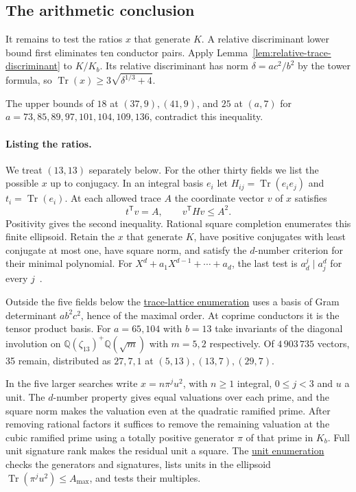 \documentclass[11pt,reqno]{amsart}
\newcommand{\codecheck}[2]{\href{https://github.com/sebastienpalcoux/grothendieck-ring-classification/blob/d5750105bb5758f3ad38d2e5464dfcc12c019816/supplements/rank6/sphericality/#1}{#2}}
\theoremstyle{remark}\newtheorem{remark}[theorem]{Remark}
\numberwithin{equation}{section}
\begin{document}
\subsection{The arithmetic conclusion}
It remains to test the ratios $x$ that generate $K$. A relative
discriminant lower bound first eliminates ten conductor pairs.
Apply Lemma~\ref{lem:relative-trace-discriminant} to $K/K_b$.
Its relative discriminant has norm $\delta=ac^2/b^2$ by the tower
formula, so $\operatorname{Tr}(x)\ge3\sqrt{\delta^{1/3}+4}$.

The upper
bounds of $18$ at $(37,9),(41,9)$, and $25$ at $(a,7)$ for
$a=73,85,89,97,101,104,109,136$, contradict this inequality.

\paragraph{Listing the ratios.}
We treat $(13,13)$ separately below. For the other thirty fields we
list the possible $x$ up to conjugacy. In an integral basis $e_i$ let
$H_{ij}=\operatorname{Tr}(e_ie_j)$ and $t_i=\operatorname{Tr}(e_i)$.
At each allowed trace $A$ the coordinate vector $v$ of $x$ satisfies
\[
 t^{\mathsf T}v=A,\qquad v^{\mathsf T}Hv\le A^2.
\]
Positivity gives the second inequality. Rational square completion
enumerates this finite ellipsoid. Retain the $x$ that generate $K$, have positive conjugates with least
conjugate at most one, have square norm, and satisfy the $d$-number
criterion for their minimal polynomial.
For $X^d+a_1X^{d-1}+\cdots+a_d$, the last test is
$a_d^j\mid a_j^d$ for every $j$~\cite{OstrikCodegrees}.

Outside the five fields below the
\codecheck{sextic_complement/sextic_lattice.py}{trace-lattice enumeration}
uses a basis of Gram determinant $ab^2c^2$, hence of the maximal order.
At coprime conductors it is the tensor product basis. For $a=65,104$
with $b=13$ take invariants of the diagonal involution on
$\mathbb Q(\zeta_{13})^+\mathbb Q(\sqrt m)$ with $m=5,2$ respectively.
Of $4\,903\,735$ vectors, 35 remain, distributed as $27,7,1$ at
$(5,13),(13,7),(29,7)$.

In the five larger searches write $x=n\pi^j u^2$, with $n\ge1$ integral,
$0\le j<3$ and $u$ a unit. The $d$-number property gives equal
valuations over each prime, and the square norm makes the valuation
even at the quadratic ramified prime. After removing rational factors
it suffices to remove the remaining valuation at the cubic ramified
prime using a totally positive generator $\pi$ of that prime in $K_b$.
Full unit signature rank makes the residual unit a square. The
\codecheck{sextic_complement/positive_dnumber_squares.py}{unit enumeration}
checks the generators and signatures, lists units in the ellipsoid
$\operatorname{Tr}(\pi^j u^2)\le A_{\max}$, and tests their multiples.
\end{document}
